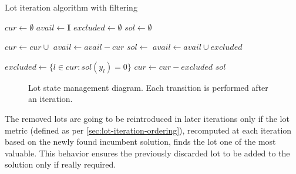 \documentclass[a4paper, twocolumn, oneside, 10pt]{article}
\begin{document}
\begin{algorithm}
	\caption{Lot iteration algorithm with filtering}\label{alg:lot-iter-filter}
	\begin{algorithmic}
		\State $cur \gets \emptyset$
		\State $avail \gets \mathbf{I}$
		\State $excluded \gets \emptyset$
		\State $sol \gets \emptyset$

			\State {}

			\State $cur \gets cur \cup $ 
			\State $avail \gets avail - cur$
			\State $sol \gets $
			\State $avail \gets avail \cup excluded$

			\State $excluded \gets \{l \in cur : sol(y_l) = 0\}$
			\State $cur \gets cur - excluded$
		\EndWhile
		\State \Return $sol$		
		\EndFunction
	\end{algorithmic}
\end{algorithm}

\begin{figure}
	\centering
	\caption{Lot state management diagram. Each transition is performed after an iteration.}\label{fig:lot-state-mgmt}
\end{figure}

The removed lots are going to be reintroduced in later iterations only if the lot metric (defined as per \cref{sec:lot-iteration-ordering}), recomputed at each iteration based on the newly found incumbent solution, finds the lot one of the most valuable. This behavior ensures the previously discarded lot to be added to the solution only if really required.
\end{document}
